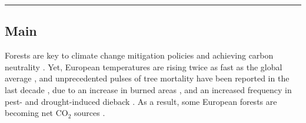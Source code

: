 \documentclass[11pt,letter]{article}
\begin{document}

\noindent\rule{\textwidth}{0.3pt}

\linenumbers

\subsection*{Main}

Forests are key to climate change mitigation policies and achieving carbon neutrality  \citep{Korosuo2023, Hyyrynen2023}. Yet, %
European 
temperatures are rising twice as fast as the global average \citep{CCCS2024}, and unprecedented pulses of tree mortality  have been reported in the last decade \citep{Senf2020}, due to an increase in  burned areas \citep{Carnicer2022, Kelly2024}, and an increased frequency in pest- and drought-induced dieback \citep{Karelin2021, Cienciala2024, Latifovic2024}. As a result, some European forests are becoming net CO$_2$ sources \citep{Hadden2016, Karelin2021}.
\end{document}
